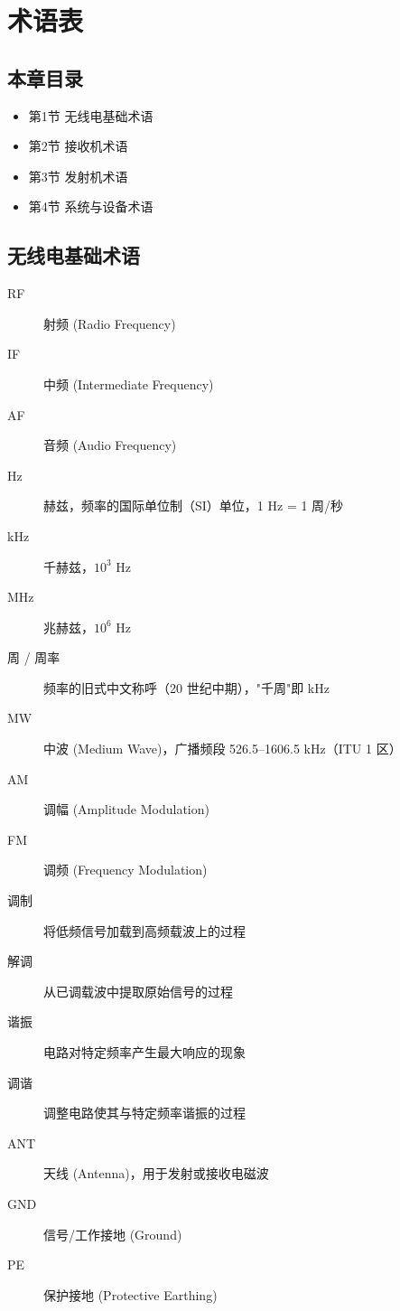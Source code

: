 
\chapter{术语表}
\label{chap:glossary}

\section{本章目录}
\begin{itemize}
    \item 第1节 无线电基础术语
    \item 第2节 接收机术语
    \item 第3节 发射机术语
    \item 第4节 系统与设备术语
\end{itemize}

\section{无线电基础术语}

\begin{description}
    \item[RF] 射频 (Radio Frequency)
    \item[IF] 中频 (Intermediate Frequency)
    \item[AF] 音频 (Audio Frequency)
    \item[Hz] 赫兹，频率的国际单位制（SI）单位，1 Hz = 1 周/秒
    \item[kHz] 千赫兹，$10^3$ Hz
    \item[MHz] 兆赫兹，$10^6$ Hz
    \item[周 / 周率] 频率的旧式中文称呼（20 世纪中期），"千周"即 kHz
    \item[MW] 中波 (Medium Wave)，广播频段 526.5–1606.5 kHz（ITU 1 区）
    \item[AM] 调幅 (Amplitude Modulation)
    \item[FM] 调频 (Frequency Modulation)
    \item[调制] 将低频信号加载到高频载波上的过程
    \item[解调] 从已调载波中提取原始信号的过程
    \item[谐振] 电路对特定频率产生最大响应的现象
    \item[调谐] 调整电路使其与特定频率谐振的过程
    \item[ANT] 天线 (Antenna)，用于发射或接收电磁波
    \item[GND] 信号/工作接地 (Ground)
    \item[PE] 保护接地 (Protective Earthing)
\end{description}

